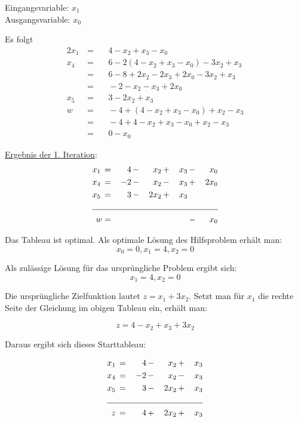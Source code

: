 \documentclass[10pt,a4paper,oneside,ngerman,numbers=noenddot]{scrartcl}
\begin{document}
		Eingangsvariable: $x_{1}$ \\
		Ausgangsvariable: $x_{0}$
		
		Es folgt
		\begin{alignat*}{2}
			x_{1} \,&=&&\, 4 - x_{2} + x_{3} - x_{0} \\
			x_{4} \,&=&&\, 6 - 2\left(4 - x_{2} + x_{3} - x_{0}\right) - 3x_{2} + x_{3} \\
			&=&&\, 6 - 8 + 2x_{2} - 2x_{3} + 2x_{0} - 3x_{2} + x_{3}\\
			&=&&\, -2 - x_{2} - x_{3} + 2x_{0} \\
			x_{5} \,&=&&\, 3 - 2x_{2} + x_{3} \\
			w \,&=&&\, -4 + \left(4 - x_{2} + x_{3} - x_{0}\right) + x_{2} - x_{3} \\
			&=&&\, -4 + 4 - x_{2} + x_{3} - x_{0} + x_{2} - x_{3} \\
			&=&&\, 0 - x_{0}
		\end{alignat*}
		
		\underline{Ergebnis der 1. Iteration}:
		\begin{alignat*}{5}
			x_{1} \,&=&\, 4 \,&-&\, x_{2} \,&+&\, x_{3} \,&-&\, x_{0}  \\
			x_{4} \,&=&\, -2 \,&-&\, x_{2} \,&-&\, x_{3} \,&+&\, 2x_{0} \\
			x_{5} \,&=&\, 3 \,&-&\, 2x_{2} \,&+&\, x_{3} \,&& \\ \cline{1 - 9}
			w &=&  && && &-&\, x_{0}
		\end{alignat*}
		
		Das Tableau ist optimal. Als optimale Lösung des Hilfsproblem erhält man:
		\[
			x_{0} = 0, x_{1} = 4, x_{2} = 0
		\]
		
		Als zulässige Lösung für das ursprüngliche Problem ergibt sich:
		\[
			x_{1} = 4, x_{2} = 0
		\]
		
		Die ursprüngliche Zielfunktion lautet $z = x_{1} + 3x_{2}$. Setzt man für $x_{1}$ die rechte Seite der Gleichung im obigen Tableau ein, erhält man:
		
		\[
			z = 4 - x_{2} + x_{3} + 3x_{2}
		\]
		
		Daraus ergibt sich dieses Starttableau:
		
		\begin{alignat*}{4}
			x_{1} \,&=&\, 4 \,&-&\, x_{2} \,&+&\, x_{3} \\
			x_{4} \,&=&\, -2 \,&-&\, x_{2} \,&-&\, x_{3} \\
			x_{5} \,&=&\, 3 \,&-&\, 2x_{2} \,&+&\, x_{3} \\ \cline{1 - 7}
			z \,&=&\, 4 \,&+&\, 2x_{2} \,&+&\, x_{3}
		\end{alignat*}
		
\end{document}

